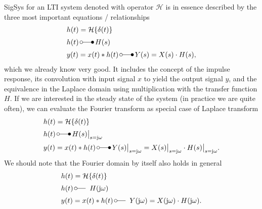 \documentclass[11pt,a4paper,DIV=12]{scrartcl}
\numberwithin{equation}{section}
\numberwithin{figure}{section}
\begin{document}
\begin{mdframed}
SigSys for an LTI system denoted with operator $\mathcal{H}$ is in essence described
by the three most important equations / relationships
\begin{align}
&h(t) = \mathcal{H}\{\delta(t)\}\\
&h(t) \,\laplace\, H(s)\\
&y(t) = x(t) \ast h(t) \,\laplace\, Y(s) = X(s) \cdot H(s),
\end{align}
which we already know very good.
%
It includes the concept of the impulse response, its convolution with input
signal $x$ to yield the output signal $y$, and the equivalence in the Laplace
domain using multiplication with the transfer function $H$.
If we are interested in the steady state of the system (in practice we are quite often),
we can evaluate the Fourier transform as special case of Laplace transform
\begin{align}
&h(t) = \mathcal{H}\{\delta(t)\}\\
&h(t) \,\laplace\, H(s)\big|_{s=\im\omega}\\
&y(t) = x(t) \ast h(t) \,\laplace\, Y(s)\big|_{s=\im\omega} = X(s)\big|_{s=\im\omega} \cdot H(s)\big|_{s=\im\omega}.
\end{align}
%
We should note that the Fourier domain by itself also holds in general
\begin{align}
&h(t) = \mathcal{H}\{\delta(t)\}\\
&h(t) \,\fourier\, H(\im\omega)\\
&y(t) = x(t) \ast h(t) \,\fourier\, Y(\im\omega) = X(\im\omega) \cdot H(\im\omega).
\end{align}
\end{mdframed}

\clearpage
\end{document}
